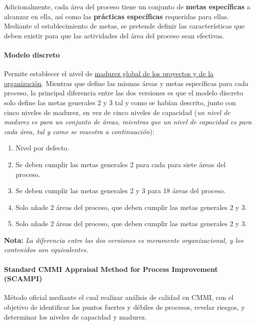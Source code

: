 Adicionalmente, cada área del proceso tiene un conjunto de \textbf{metas específicas} a alcanzar en ella, así como las \textbf{prácticas específicas} requeridas para ellas.\\

Mediante el establecimiento de metas, se pretende definir las características que deben existir para que las actividades del área del proceso sean efectivas. 

\paragraph{Modelo discreto} Permite establecer el nivel de \uline{madurez global de los proyectos y de la organización}. Mientras que define las mismas áreas y metas específicas para cada proceso, la principal diferencia entre las dos versiones es que el modelo discreto solo define las metas generales 2 y 3 tal y como se habían descrito, junto con cinco niveles de madurez, en vez de cinco niveles de capacidad (\textit{un nivel de madurez es para un conjunto de áreas, mientras que un nivel de capacidad es para cada área, tal y como se muestra a continuación}):

\begin{enumerate}
    \item Nivel por defecto.
    \item Se deben cumplir las metas generales 2 para cada para siete áreas del proceso.
    \item Se deben cumplir las metas generales 2 y 3 para 18 áreas del proceso.
    \item Solo añade 2 áreas del proceso, que deben cumplir las metas generales 2 y 3.
    \item Solo añade 2 áreas del proceso, que deben cumplir las metas generales 2 y 3.
\end{enumerate}

\textbf{Nota:} \textit{La diferencia entre las dos versiones es meramente organizacional, y los contenidos son equivalentes.}

\paragraph{Standard CMMI Appraisal Method for Process Improvement (SCAMPI)}

Método oficial mediante el cual realizar análisis de calidad en CMMI, con el objetivo de identificar los puntos fuertes y débiles de procesos, revelar riesgos, y determinar los niveles de capacidad y madurez.\\
